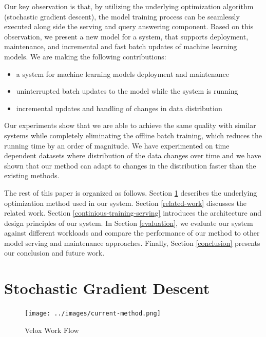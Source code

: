 \documentclass{sig-alternate-05-2015}
\begin{document}
Our key observation is that, by utilizing the underlying optimization algorithm (stochastic gradient descent), the model training process can be seamlessly executed along side the serving and query answering component.
Based on this observation, we present a new model for a system, that supports deployment, maintenance, and incremental and fast batch updates of machine learning models.
We are making the following contributions: 
\begin{itemize}
\item a system for machine learning models deployment and maintenance
\item uninterrupted batch updates to the model while the system is running
\item incremental updates and handling of changes in data distribution
\end{itemize}
Our experiments show that we are able to achieve the same quality with similar systems while completely eliminating the offline batch training, which reduces the running time by an order of magnitude. 
We have experimented on time dependent datasets where distribution of the data changes over time and we have shown that our method can adapt to changes in the distribution faster than the existing methods.

The rest of this paper is organized as follows. 
Section \ref{sgd} describes the underlying optimization method used in our system. 
Section \ref {related-work} discusses the related work.
Section \ref{continious-training-serving} introduces the architecture and design principles of our system. 
In Section \ref{evaluation}, we evaluate our system against different workloads and compare the performance of our method to other model serving and maintenance approaches. 
Finally, Section \ref{conclusion} presents our conclusion and future work.

\section{Stochastic Gradient Descent} \label{sgd}
\begin{figure}[!t]
\centering
\texttt{[image: ../images/current-method.png]}
\caption{Velox Work Flow}
\label{fig:velox-work-flow}
\end{figure}
\end{document}
